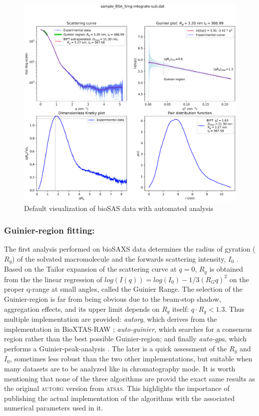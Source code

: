 \documentclass[preprint]{iucr}              %
\begin{document}
\begin{figure}
\label{plot}
\begin{center}
\includegraphics[width=12cm]{Figure_1.eps}
\caption{Default visualization of bioSAS data with automated analysis}
\end{center}
\end{figure}


\subsubsection{Guinier-region fitting:}
The first analysis performed on bioSAXS data determines the radius of gyration ($R_g$) of the solvated macromolecule and the forwards scattering intensity, $I_0$ \cite{guinier}.
Based on the Tailor expansion of the scattering curve at $q=0$, $R_g$ is obtained from the the linear regression of $log(I(q)) = log(I_0)-1/3 (R_{G}q)^{2}$ on the proper q-range at small angles, called the Guinier Range.
The selection of the Guinier-region is far from being obvious due to the beam-stop shadow, aggregation effects, and its upper limit depends on $R_g$ itself: $q \cdot R_g<1.3$.
Thus multiple implementation are provided: \textit{autorg}, which derives from the implementation in BioXTAS-RAW \cite{bioxtasraw}; \textit{auto-guinier}, which searches for a consensus region rather than the best possible Guinier-region; and finally \textit{auto-gpa}, which performs a Guinier-peak-analysis \cite{gpa}. 
The later is a quick assessment of the $R_g$ and $I_0$, sometimes less robust than the two other implementations, but suitable when many datasets are to be analyzed like in chromatography mode.
It is worth mentioning that none of the three algorithms are provid the exact same results as the original \textsc{autorg} \cite{ATSAS2} version from \textsc{atsas}. 
This highlights the importance of publishing the actual implementation of the algorithms with the associated numerical parameters used in it.
  
\end{document}
